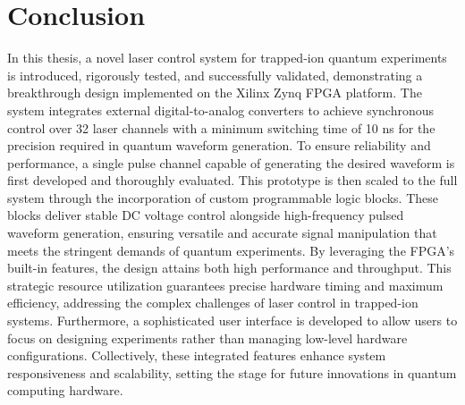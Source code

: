 \chapter{Conclusion}

In this thesis, a novel laser control system for trapped-ion quantum experiments is introduced, rigorously tested, and successfully validated, demonstrating a breakthrough design implemented on the Xilinx Zynq FPGA platform. The system integrates external digital-to-analog converters to achieve synchronous control over 32 laser channels with a minimum switching time of 10 ns for the precision required in quantum waveform generation. To ensure reliability and performance, a single pulse channel capable of generating the desired waveform is first developed and thoroughly evaluated. This prototype is then scaled to the full system through the incorporation of custom programmable logic blocks. These blocks deliver stable DC voltage control alongside high-frequency pulsed waveform generation, ensuring versatile and accurate signal manipulation that meets the stringent demands of quantum experiments. By leveraging the FPGA's built-in features, the design attains both high performance and throughput. This strategic resource utilization guarantees precise hardware timing and maximum efficiency, addressing the complex challenges of laser control in trapped-ion systems. Furthermore, a sophisticated user interface is developed to allow users to focus on designing experiments rather than managing low-level hardware configurations. Collectively, these integrated features enhance system responsiveness and scalability, setting the stage for future innovations in quantum computing hardware.